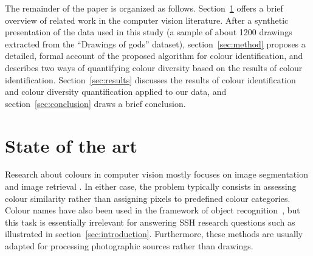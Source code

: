 \documentclass[11pt,a4paper]{article}
\begin{document}
The remainder of the paper is organized as follows. Section~\ref{sec:state_of_the_art} offers a brief overview of related work in the computer vision literature. After a synthetic presentation of the data used in this study (a sample of about 1200 drawings extracted from the ``Drawings of gods'' dataset), section~\ref{sec:method} proposes a detailed, formal account of the proposed algorithm for colour identification, and describes two ways of quantifying colour diversity based on the results of colour identification. Section~\ref{sec:results} discusses the results of colour identification and colour diversity quantification applied to our data, and section~\ref{sec:conclusion} draws a brief conclusion.


\section{State of the art}
\label{sec:state_of_the_art}

Research about colours in computer vision mostly focuses on image segmentation \cite[see e.g.][]{ChengSun2000,ChenPappasMojsilovicEtAl2005,HanmandluVermaSusanEtAl2013} and image retrieval \cite[see e.g.][]{DengManjunathKenneyEtAl2001,RaoKumar2015,ZhangZhangYaoEtAl2016}. In either case, the problem typically consists in assessing colour similarity rather than assigning pixels to predefined colour categories. Colour names have also been used in the framework of object recognition~\cite[see e.g.][]{khan2013}, but this task is essentially irrelevant for answering SSH research questions such as illustrated in section~\ref{sec:introduction}. Furthermore, these methods are usually adapted for processing photographic sources rather than drawings.



\end{document}
